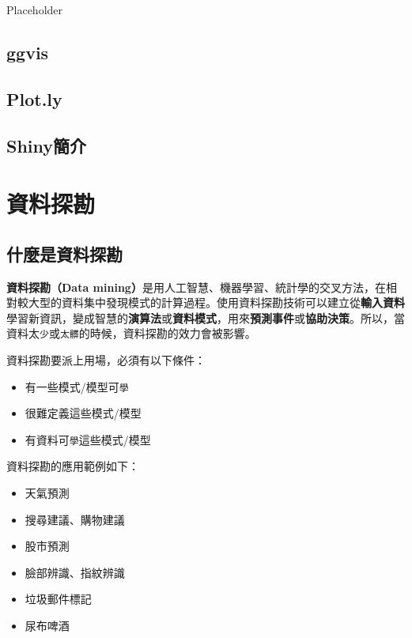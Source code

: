 \documentclass[
]{book}
\providecommand{\tightlist}{%
  \setlength{\itemsep}{0pt}\setlength{\parskip}{0pt}}
\begin{document}
Placeholder

\hypertarget{ggvis}{%
\section{ggvis}\label{ggvis}}

\hypertarget{plot.ly}{%
\section{Plot.ly}\label{plot.ly}}

\hypertarget{shinyux7c21ux4ecb}{%
\section{Shiny簡介}\label{shinyux7c21ux4ecb}}

\hypertarget{datamining}{%
\chapter{資料探勘}\label{datamining}}

\hypertarget{ux4ec0ux9ebcux662fux8cc7ux6599ux63a2ux52d8}{%
\section{什麼是資料探勘}\label{ux4ec0ux9ebcux662fux8cc7ux6599ux63a2ux52d8}}

\textbf{資料探勘（Data mining）}是用人工智慧、機器學習、統計學的交叉方法，在相對較大型的資料集中發現模式的計算過程。使用資料探勘技術可以建立從\textbf{輸入資料}學習新資訊，變成智慧的\textbf{演算法}或\textbf{資料模式}，用來\textbf{預測事件}或\textbf{協助決策}。所以，當資料太\texttt{少}或\texttt{太髒}的時候，資料探勘的效力會被影響。

資料探勘要派上用場，必須有以下條件：

\begin{itemize}
\tightlist
\item
  有一些模式/模型可\texttt{學}
\item
  很難定義這些模式/模型
\item
  有資料可\texttt{學}這些模式/模型
\end{itemize}

資料探勘的應用範例如下：

\begin{itemize}
\tightlist
\item
  天氣預測
\item
  搜尋建議、購物建議
\item
  股市預測
\item
  臉部辨識、指紋辨識
\item
  垃圾郵件標記
\item
  尿布啤酒
\end{itemize}
\end{document}
